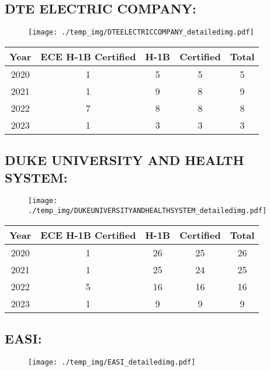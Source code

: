 \documentclass{article}%
\begin{document}
%
\newpage%
\subsection{DTE ELECTRIC COMPANY:}%
\label{subsec:DTEELECTRICCOMPANY}%
\label{DTEELECTRICCOMPANYdetailed}%


\begin{figure}[htbp]%
\centering%
\texttt{[image: ./temp\_img/DTEELECTRICCOMPANY\_detailedimg.pdf]}%
\end{figure}

%
\begin{longtable}{c|c|c|c|c}%
\hline%
Year&ECE H{-}1B Certified&H{-}1B&Certified&Total\\%
\hline%
2020&1&5&5&5\\%
\hline%
2021&1&9&8&9\\%
\hline%
2022&7&8&8&8\\%
\hline%
2023&1&3&3&3\\%
\hline%
\end{longtable}

%
\newpage%
\subsection{DUKE UNIVERSITY AND HEALTH SYSTEM:}%
\label{subsec:DUKEUNIVERSITYANDHEALTHSYSTEM}%
\label{DUKEUNIVERSITYANDHEALTHSYSTEMdetailed}%


\begin{figure}[htbp]%
\centering%
\texttt{[image: ./temp\_img/DUKEUNIVERSITYANDHEALTHSYSTEM\_detailedimg.pdf]}%
\end{figure}

%
\begin{longtable}{c|c|c|c|c}%
\hline%
Year&ECE H{-}1B Certified&H{-}1B&Certified&Total\\%
\hline%
2020&1&26&25&26\\%
\hline%
2021&1&25&24&25\\%
\hline%
2022&5&16&16&16\\%
\hline%
2023&1&9&9&9\\%
\hline%
\end{longtable}

%
\newpage%
\subsection{EASI:}%
\label{subsec:EASI}%
\label{EASIdetailed}%


\begin{figure}[htbp]%
\centering%
\texttt{[image: ./temp\_img/EASI\_detailedimg.pdf]}%
\end{figure}
\end{document}
